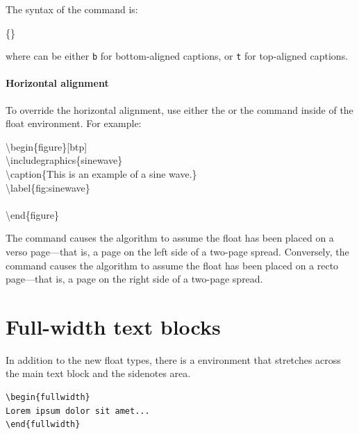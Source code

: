 \noindent The syntax of the  command is:

\begin{docspec}
  \{\}
\end{docspec}

\noindent where  can be either \texttt{b} for bottom-aligned
captions, or \texttt{t} for top-aligned captions.

\paragraph{Horizontal alignment}\label{par:overriding-horizontal}
To override the horizontal alignment, use either the 
or the  command inside of the float environment.  For
example:

\begin{fullwidth}
\begin{docspec}
  \textbackslash begin\{figure\}[btp]\\
  \qquad \textbackslash includegraphics\{sinewave\}\\
  \qquad \textbackslash caption\{This is an example of a sine wave.\}\\
  \qquad \textbackslash label\{fig:sinewave\}\\
  \qquad {}\\
  \textbackslash end\{figure\}
\end{docspec}
\end{fullwidth}

The  command causes the algorithm to assume the
float has been placed on a verso page---that is, a page on the left side of a
two-page spread.  Conversely, the  command causes
the algorithm to assume the float has been placed on a recto page---that is, a
page on the right side of a two-page spread.


\section{Full-width text blocks}

In addition to the new float types, there is a 
environment that stretches across the main text block and the sidenotes
area.

\begin{Verbatim}
\begin{fullwidth}
Lorem ipsum dolor sit amet...
\end{fullwidth}
\end{Verbatim}

